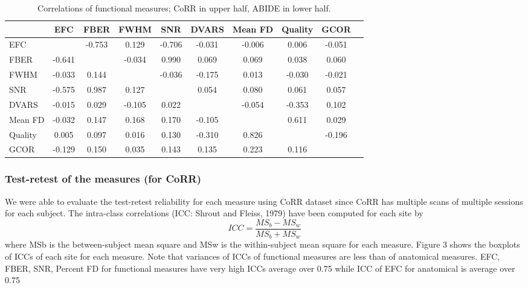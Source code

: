 \documentclass{frontiersSCNS} %
\begin{document}
\begin{table}[h]
  \begin{center}
    \begin{tabular}{ | l | c | c | c | c | c | c | c | c | p{1.5cm}}
    \hline
     & EFC & FBER & FWHM & SNR & DVARS & Mean FD & Quality & GCOR  \\ \hline
    EFC & & -0.753 & 0.129 & -0.706 & -0.031 & -0.006 & 0.006 & -0.051 \\
    FBER & -0.641 & & -0.034 & 0.990 & 0.069 & 0.069 & 0.038 & 0.060 \\
    FWHM & -0.033 & 0.144 & & -0.036 & -0.175 & 0.013 & -0.030 & -0.021 \\
    SNR & -0.575 & 0.987 & 0.127 & & 0.054 & 0.080 & 0.061 & 0.057 \\
    DVARS & -0.015 & 0.029 & -0.105 & 0.022 & & -0.054 & -0.353 & 0.102 \\
    Mean FD & -0.032 & 0.147 & 0.168 & 0.170 & -0.105 & & 0.611 & 0.029 \\
    Quality & 0.005 & 0.097 & 0.016 & 0.130 & -0.310 & 0.826 & & -0.196 \\
    GCOR & -0.129 & 0.150 & 0.035 & 0.143 & 0.135 & 0.223 & 0.116 & \\ 
    \hline
    \end{tabular}
  \end{center}
  \caption{Correlations of functional measures; CoRR in upper half, ABIDE in lower half.}
\end{table}
\subsubsection{Test-retest of the measures (for CoRR)}
\label{sec:26}
We were able to evaluate the test-retest reliability for each measure using CoRR dataset since CoRR has multiple scans of multiple sessions for each subject. The intra-class correlations (ICC: Shrout and Fleiss, 1979) have been computed for each site by
\begin{equation}
ICC = \frac{MS_b - MS_w} {MS_b + MS_w}
\end{equation}
where MSb is the between-subject mean square and MSw is the within-subject mean square for each measure. Figure 3 shows the boxplots of ICCs of each site for each measure. Note that variances of ICCs of functional measures are less than of anatomical measures. EFC, FBER, SNR, Percent FD for functional measures have very high ICCs average over 0.75 while ICC of EFC for anatomical is average over 0.75
\end{document}
